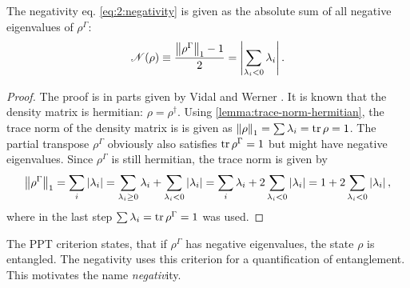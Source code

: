 \begin{proposition}\label{proposition:negativity}
  The negativity eq. \eqref{eq:2:negativity} is given as the absolute sum of all negative eigenvalues of $\rho^{\Gamma}$: 
\begin{equation}
    \mathscr{N}(\rho) \equiv \frac{\left\lVert\rho^{\Gamma}\right\rVert_1 - 1}{2} = \left\lvert\sum_{\lambda_i < 0} \lambda_i\right\rvert.
\end{equation}
\end{proposition}
\begin{proof}
  The proof is in parts given by Vidal and Werner \cite{Vidal_2001}. It is known that the density matrix is hermitian: $\rho = \rho^\dagger$. Using \cref{lemma:trace-norm-hermitian}, the trace norm of the density matrix is is given as $\left\lVert\rho\right\rVert_1=\sum \lambda_i = \tr \rho = 1$. The partial transpose $\rho^{\Gamma}$ obviously also satisfies $\tr \rho^{\Gamma} = 1$ but might have negative eigenvalues. Since $\rho^{\Gamma}$ is still hermitian, the trace norm is given by
  \begin{equation*}
    \left\lVert\rho^{\Gamma}\right\rVert_1 = \sum_i\left\lvert\lambda_i\right\rvert = \sum_{\lambda_i \ge 0} \lambda_i + \sum_{\lambda_i < 0} \left\lvert\lambda_i\right\rvert = \sum_i \lambda_i + 2\sum_{\lambda_i < 0} \left\lvert\lambda_i\right\rvert = 1 + 2\sum_{\lambda_i < 0} \left\lvert\lambda_i\right\rvert ,
  \end{equation*}
  where in the last step $\sum \lambda_i = \tr \rho^{\Gamma} = 1$ was used.
\end{proof}
\begin{remark}
  The PPT criterion states, that if $\rho^{\Gamma}$ has negative eigenvalues, the state $\rho$ is entangled. The negativity uses this criterion for a quantification of entanglement. This motivates the name \textit{negativ}ity.
\end{remark}

